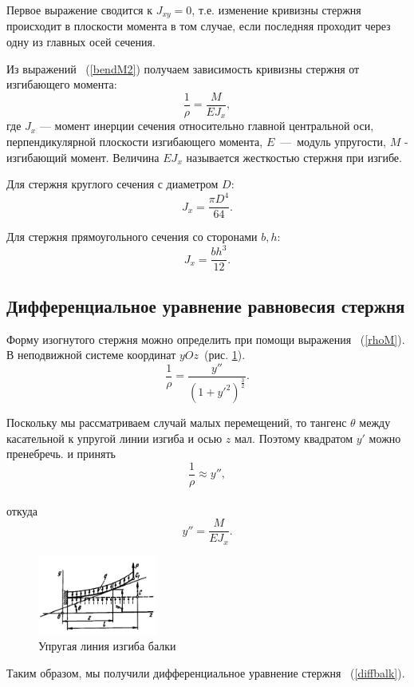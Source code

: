 \documentclass[12pt, a4paper]{article}
\begin{document}
Первое выражение сводится к $J_{xy} = 0$, т.е. изменение кривизны стержня происходит в плоскости момента в том случае, если последняя проходит через одну из главных осей сечения.

Из выражений ~(\ref{bendM2}) получаем зависимость кривизны стержня от изгибающего момента:
\begin{equation}
 	\label{rhoM}
 	\frac{1}{\rho} = \frac{M}{E J_{x}}, 
 \end{equation}
где $J_{x}$ --- момент инерции сечения относительно главной центральной оси, перпендикулярной плоскости изгибающего момента, $E$~---~модуль упругости, $M$ - изгибающий момент. Величина $E J_{x}$ называется жесткостью стержня при изгибе.

Для стержня круглого сечения с диаметром $D$:
\begin{equation}
	\label{Jround}
	J_{x} = \frac{\pi D^4}{64}.
\end{equation}

Для стержня прямоугольного сечения со сторонами $b, h$:
\begin{equation}
	\label{Jsq}
	J_{x} = \frac{b h^3}{12}.
\end{equation}

\subsection{Дифференциальное уравнение равновесия стержня}
Форму изогнутого стержня можно определить при помощи выражения ~(\ref{rhoM}). В неподвижной системе координат $yOz$~(рис. \ref{pic6}). 
\begin{equation}
	\label{diffbalkf}
	\frac{1}{\rho} = \frac{y''}{(1 + y'^2)^{\frac{3}{2}}}.
\end{equation}

Поскольку мы рассматриваем случай малых перемещений, то тангенс $ \theta$ между касательной к упругой линии изгиба и осью $z$ мал. Поэтому квадратом $y'$ можно пренебречь. и принять
\begin{equation}
	\label{diffbalkcurve}
	\frac{1}{\rho} \approx y'',
\end{equation}
\\откуда 
\begin{equation}
	\label{diffbalk}
	y'' = \frac{M}{E J_{x}}.
\end{equation}
\begin{figure}[!h]
	\centering
	\includegraphics[width=0.35\textwidth]{pic.6}%
	\caption{Упругая линия изгиба балки}
	\vspace*{-2mm}
	\label{pic6}
\end{figure}
Таким образом, мы получили дифференциальное уравнение стержня ~(\ref{diffbalk}). 
\end{document}
